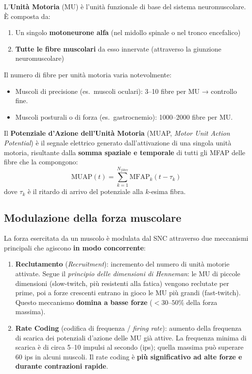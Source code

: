 \begin{definizione}
L'\textbf{Unità Motoria} (MU) è l'unità funzionale di base del sistema neuromuscolare. È composta da:
\begin{enumerate}
    \item Un singolo \textbf{motoneurone alfa} (nel midollo spinale o nel tronco encefalico)
    \item \textbf{Tutte le fibre muscolari} da esso innervate (attraverso la giunzione neuromuscolare)
\end{enumerate}
\end{definizione}

Il numero di fibre per unità motoria varia notevolmente:
\begin{itemize}
    \item Muscoli di precisione (es.\ muscoli oculari): 3--10 fibre per MU → controllo fine.
    \item Muscoli posturali o di forza (es.\ gastrocnemio): 1000--2000 fibre per MU.
\end{itemize}

Il \textbf{Potenziale d'Azione dell'Unità Motoria} (MUAP, \textit{Motor Unit Action Potential}) è il segnale elettrico generato dall'attivazione di una singola unità motoria, risultante dalla \textbf{somma spaziale e temporale} di tutti gli MFAP delle fibre che la compongono:
\[
\text{MUAP}(t) = \sum_{k=1}^{N_{fibre}} \text{MFAP}_k(t - \tau_k)
\]
dove $\tau_k$ è il ritardo di arrivo del potenziale alla $k$-esima fibra.

\subsection{Modulazione della forza muscolare}

La forza esercitata da un muscolo è modulata dal SNC attraverso due meccanismi principali che agiscono \textbf{in modo concorrente}:

\begin{enumerate}
    \item \textbf{Reclutamento} (\textit{Recruitment}): incremento del numero di unità motorie attivate. Segue il \textit{principio delle dimensioni di Henneman}: le MU di piccole dimensioni (slow-twitch, più resistenti alla fatica) vengono reclutate per prime, poi a forze crescenti entrano in gioco le MU più grandi (fast-twitch). Questo meccanismo \textbf{domina a basse forze} (\(<30\text{--}50\%\) della forza massima).

    \item \textbf{Rate Coding} (codifica di frequenza / \textit{firing rate}): aumento della frequenza di scarica dei potenziali d'azione delle MU già attive. La frequenza minima di scarica è di circa 5--10 impulsi al secondo (ips); quella massima può superare 60 ips in alcuni muscoli. Il rate coding è \textbf{più significativo ad alte forze e durante contrazioni rapide}.
\end{enumerate}

